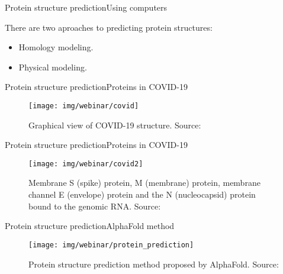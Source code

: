 \documentclass[10pt]{beamer}
\newcommand{\1}{
        	\setbeamertemplate{background}{
        		\texttt{[image: img/1]}
        		\tikz[overlay] \fill[fill opacity=0.75,fill=white] (0,0) rectangle (-\paperwidth,\paperheight);
        	}
}
\begin{document}
\begin{frame}{Protein structure prediction}{Using computers}
	\begin{block}{}
		There are two aproaches to predicting protein structures:
		\begin{itemize}
			\item Homology modeling.
			\item Physical modeling.
		\end{itemize}
	\end{block}
	
\end{frame}

\begin{frame}{Protein structure prediction}{Proteins in COVID-19}
	\begin{figure}[]
		\centering
		\texttt{[image: img/webinar/covid]}
		\label{img:mot2}
		\caption{Graphical view of COVID-19 structure. Source: \cite{Goodsell2020}}
	\end{figure}
\end{frame}

\begin{frame}{Protein structure prediction}{Proteins in COVID-19}
	\begin{figure}[]
		\centering
		\texttt{[image: img/webinar/covid2]}
		\label{img:mot2}
		\caption{Membrane S (spike) protein, M (membrane) protein, membrane channel E (envelope) protein and the N (nucleocapsid) protein bound to the genomic RNA. Source: \cite{Goodsell2020}}
	\end{figure}
\end{frame}


\begin{frame}{Protein structure prediction}{AlphaFold method}
	\begin{figure}[]
		\centering
		\texttt{[image: img/webinar/protein\_prediction]}
		\label{img:mot2}
		\caption{Protein structure prediction method proposed by AlphaFold. Source: \cite{alphafold2020}}
	\end{figure}
\end{frame}
\end{document}
